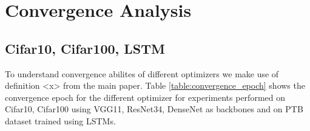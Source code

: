 \section{Convergence Analysis}
\subsection{Cifar10, Cifar100, LSTM}
To understand convergence abilites of different optimizers we make use of definition <x> from the main paper. Table \ref{table:convergence_epoch} shows the convergence epoch for the different optimizer for experiments performed on Cifar10, Cifar100 using VGG11, ResNet34, DenseNet as backbones and on PTB dataset trained using LSTMs.

\begin{table}[htbp]
    \centering
    \vspace{2mm}
    \caption{Epoch of convergence (out of 200) for each optimizer for different experiments. \texttt{FTC} denotes \textit{failed to converge}. AdaBelief converges at epochs similar to other optimizers from Adaptive gradient family.}
    \label{table:convergence_epoch}
\end{table}




